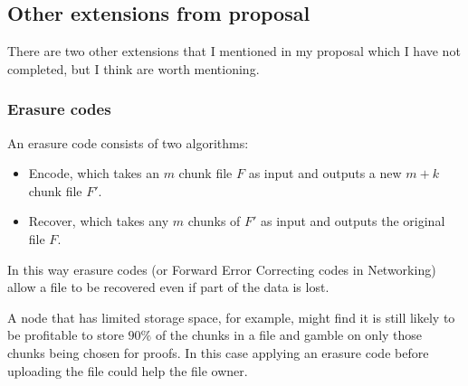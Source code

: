 \documentclass[12pt,a4paper,twoside,openright]{report}
\begin{document}
%
%
%
%
%
%


\subsection{Other extensions from proposal}

There are two other extensions that I mentioned in my proposal which I have not completed, but I think are worth mentioning.

\subsubsection{Erasure codes}\label{ext-erasure}


An erasure code consists of two algorithms:
\begin{itemize}
\item Encode, which takes an $m$ chunk file $F$ as input and outputs a new $m+k$ chunk file $F'$.
\item Recover, which takes any $m$ chunks of $F'$ as input and outputs the original file $F$.
\end{itemize}

In this way erasure codes (or Forward Error Correcting codes in Networking) allow a file to be recovered even if part of the data is lost.

A node that has limited storage space, for example, might find it is still likely to be profitable to store $90\%$ of the chunks in a file
and gamble on only those chunks being chosen for proofs.
In this case applying an erasure code before uploading the file could help the file owner.
\end{document}
